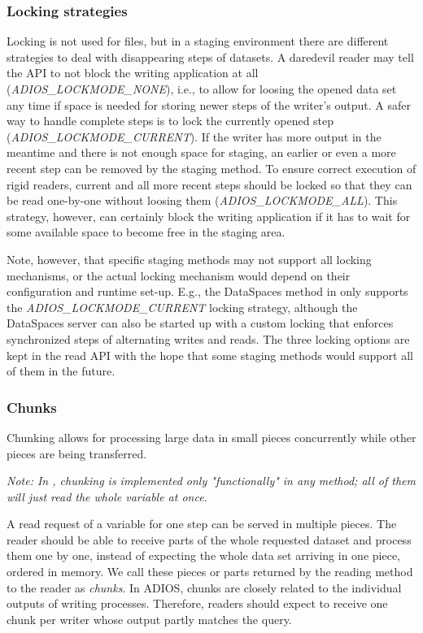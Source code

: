 \subsubsection{Locking strategies}
Locking is not used for files, but in a staging environment there are different strategies to deal with disappearing steps of datasets. A daredevil reader may tell the API to not block the writing application at all ({\em ADIOS\_LOCKMODE\_NONE}), i.e., to allow for loosing the opened data set any time if space is needed for storing newer steps of the writer's output. A safer way to handle complete steps is to lock the currently opened step ({\em ADIOS\_LOCKMODE\_CURRENT}). If the writer has more output in the meantime and there is not enough space for staging, an earlier or even a more recent step can be removed by the staging method. To ensure correct execution of  rigid readers, current and all more recent steps should be locked so that they can be read one-by-one without loosing them ({\em ADIOS\_LOCKMODE\_ALL}). This strategy, however, can certainly block the writing application if it has to wait for some available space to become free in the staging area.

Note, however, that specific staging methods may not support all locking mechanisms, or the actual locking mechanism would depend on their configuration and runtime set-up. E.g., the DataSpaces method in \adiosversion only supports the {\em ADIOS\_LOCKMODE\_CURRENT} locking strategy, although the DataSpaces server can also be started up with a custom locking that enforces synchronized steps of alternating writes and reads. The three locking options are kept in the read API with the hope that some staging methods would support all of them in the future. 

\subsubsection{Chunks}
Chunking allows for processing large data in small pieces concurrently while other pieces are being transferred.

\emph{Note: In \adiosversion, chunking is implemented only "functionally" in any method; all of them will just read the whole variable at once.}

A read request of a variable for one step can be served in multiple pieces. The reader should be able to receive parts of the whole requested dataset and process them one by one, instead of expecting the whole data set arriving in one piece, ordered in memory. We call these pieces or parts returned by the reading method to the reader as \emph{chunks}. In ADIOS, chunks are closely related to the individual outputs of writing processes. Therefore, readers should expect to receive one chunk per writer whose output partly matches the query.

